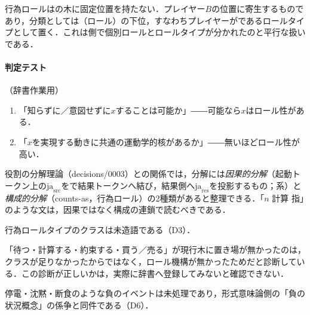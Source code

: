 \documentclass[../../main-detail.tex]{subfiles}
\begin{document}
行為ロールはの木に固定位置を持たない．プレイヤー$B$の位置に寄生するものであり，分類としては（ロール）の下位，すなわちプレイヤーがであるロールタイプとして置く．これは側で個別ロールとロールタイプが分かれたのと平行な扱いである．

\paragraph{判定テスト}（辞書作業用）
\begin{enumerate}
    \item 「知らずに／意図せずに$x$することは可能か」――可能なら$x$はロール性がある．
    \item 「$x$を実現する動きに共通の運動学的核があるか」――無いほどロール性が高い．
\end{enumerate}

\begin{remark}[2種類の分解]
役割の分解理論（decisions/0003）との関係では，分解には\emph{因果的分解}（起動トークン上の$\mathrm{ja}_{\mathrm{src}}$をで結果トークンへ結び，結果側へ$\mathrm{ja}_{\mathrm{res}}$を投影するもの；系）と\emph{構成的分解}（counts-as，行為ロール）の2種類があると整理できる．「$n$  計算  指」のような文は，因果ではなく構成の連鎖で読むべきである．
\end{remark}

\begin{araidashi}
    \item 行為ロールタイプのクラスは未造語である（D3）．
    \item 「待つ・計算する・約束する・買う／売る」が現行木に置き場が無かったのは，クラスが足りなかったからではなく，ロール機構が無かったためだと診断している．この診断が正しいかは，実際に辞書へ登録してみないと確認できない．
    \item 停電・沈黙・断食のような負のイベントは未処理であり，形式意味論側の「負の状況概念」の係争と同件である（D6）．
\end{araidashi}
\end{document}
